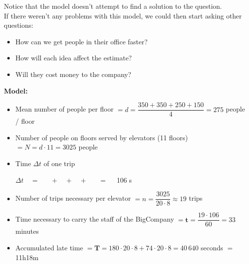 \begin{annotation}
\begin{goals}
	Notice that the model doesn't attempt to find a solution to the question. \\
	
	If there weren't any problems with this model, we could then start asking other questions:
	\begin{itemize}
		\item How can we get people in their office faster? 
		\item How will each idea affect the estimate?
		\item Will they cost money to the company?
	\end{itemize}
\end{goals}
\end{annotation}
\slidesonlynewpage
\questionagain
\textbf{Model:}
\begin{itemize}
	\item Mean number of people per floor $= d = \dfrac{350+350+250+150}{4} = 275$ people / floor
	\item Number of people on floors served by elevators (11 floors) $= N = d \cdot 11 = 3025$ people
	\item Time $\Delta t$ of one trip

\hfil $\Delta t \quad = \quad $  
		$ \;+ \;$ 
		$ \;+\; $ 
		$\;+\; $  $\quad = \quad$ 106 s
		
		\item Number of trips necessary per elevator $= n = \dfrac{3025}{20 \cdot 8} \approx 19$ trips

		\item Time necessary to carry the staff of the BigCompany $= \pmb{t} = \dfrac{19 \cdot 106}{60} = 33 $ minutes
		
		\item Accumulated late time $ = \pmb{T} = 180 \cdot 20 \cdot 8 + 74 \cdot 20 \cdot 8 = 40\,640$ seconds $= $ 11h18m

\end{itemize}

